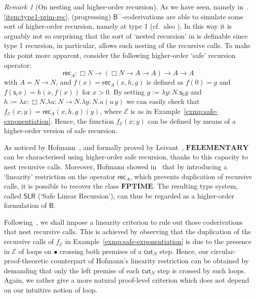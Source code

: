 \documentclass[manuscript,screen]{acmart}
\newcommand{\dfn}{:=}
\theoremstyle{definition}
\theoremstyle{remark}
\newtheorem{rem}[thm]{Remark}
\newcommand{\n}{N}
\newcommand{\sq}{\Box}
\newcommand{\sqn}{{\sq\n}}
\newcommand{\sn}{\sqn}
\newcommand{\ptime}{\mathbf{PTIME}}
\newcommand{\elementary}{\mathbf{ELEMENTARY}}
\newcommand{\f}{\mathbf{F}}
\newcommand{\fptime}{\f\ptime}
\newcommand{\felementary}{\f\elementary}
\renewcommand{\succ}[1]{\mathsf{s}_{#1}}
\newcommand{\denot}[1]{f_{#1}}
\newcommand{\sexp}{\mathcal{E}}
\newcommand{\bc}{\mathsf{B}}
\newcommand{\bcnorec}{\bc^{-}}
\newcommand{\cut}{\mathsf{cut}}
\newcommand{\slr}{\mathsf{SLR}}
\begin{document}
\begin{rem}
[On nesting and higher-order recursion]
As we
have seen, namely in~.\ref{item:type1-prim-rec},
(progressing) $\bcnorec$-coderivations are able to simulate some sort of higher-order recursion, namely at type 1 (cf.~also \cite{Das2021}).
In this way it is arguably not so surprising that the sort of `nested recursion' in  is definable since type 1 recursion, in particular, allows such nesting of the recursive calls. 
To make this point more apparent, consider the following higher-order `safe' recursion operator:
\begin{equation*}
  \mathsf{rec}_A: \sq{\n}\rightarrow (\sq{\n}\rightarrow A  \rightarrow     A)\rightarrow A \rightarrow A   
\end{equation*}
with $A= \n \rightarrow \n$, and      $f(x)=\mathsf{rec}_A(x,  h, g)$ is defined as $  f(0)=g$ and    $f(\succ i x)=h(x,f (x) )$  for $x>0$. By setting $g\dfn \lambda y:\n. \succ 0y$ and $h\dfn  \lambda x: \sn . \lambda u: \n \rightarrow \n . \lambda y: \n . u(u\, y)$ we can easily check that $\denot\sexp(x; y)= \mathsf{rec}_A(x,  h, g)(y)$, where $\sexp$ is as in Example~\ref{exmp:safe-exponentiation}. Hence, the function $\denot\sexp(x; y)$ can be defined by means of a higher-order version of safe recursion. 

As noticed by Hofmann~\cite{Hofmann97}, and formally proved by Leivant~\cite{Leivant99}, $\felementary$ can be characterised using higher-order safe recursion, thanks to this capacity to nest recursive calls.
Moreover, Hofmann showed in~\cite{Hofmann97} that by introducing a `linearity' restriction on the operator $ \mathsf{rec}_A$, which prevents duplication of recursive calls, it is possible to recover the class $\fptime$. The resulting type system, called $\slr$ (`Safe Linear Recursion'), can thus be regarded as a higher-order formulation of $\bc$.
\end{rem}


Following~\cite{Hofmann97}, we shall impose a linearity criterion to rule out those coderivations that nest recursive calls. This is achieved by observing that the duplication of the recursive calls of $\denot\sexp$ in Example~\ref{exmp:safe-exponentiation} is due to the presence in $\sexp$ of loops on $\bullet$ crossing both premises of a $\cut_\n$ step. Hence, our circular-proof-theoretic counterpart of Hofmann's linearity restriction  can be  obtained  by demanding that only the left premiss of each $\cut_\n$ step is crossed by such loops. 
Again, we rather give a more natural proof-level criterion which does not depend on our intuitive notion of loop.
\end{document}
